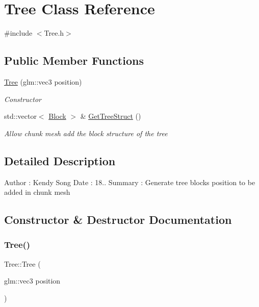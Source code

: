 \hypertarget{class_tree}{}\section{Tree Class Reference}
\label{class_tree}


{\ttfamily \#include $<$Tree.\+h$>$}

\subsection*{Public Member Functions}
\begin{DoxyCompactItemize}
\item 
\mbox{\hyperlink{class_tree_a6644970a24c82cd0ef0c0f9441b2f6e3}{Tree}} (glm\+::vec3 position)
\begin{DoxyCompactList}\small\item\em Constructor \end{DoxyCompactList}\item 
std\+::vector$<$ \mbox{\hyperlink{class_block}{Block}} $>$ \& \mbox{\hyperlink{class_tree_a09925b63b3d7fe8ba227fd454aa0906c}{Get\+Tree\+Struct}} ()
\begin{DoxyCompactList}\small\item\em Allow chunk mesh add the block structure of the tree \end{DoxyCompactList}\end{DoxyCompactItemize}


\subsection{Detailed Description}
Author \+: Kendy Song Date \+: 18.. Summary \+: Generate tree block\textquotesingle{}s position to be added in chunk mesh 

\subsection{Constructor \& Destructor Documentation}
\mbox{\label{class_tree_a6644970a24c82cd0ef0c0f9441b2f6e3}} 
\subsubsection{\texorpdfstring{Tree()}{Tree()}}
{\footnotesize\ttfamily Tree\+::\+Tree (\begin{DoxyParamCaption}\item[{glm\+::vec3}]{position }\end{DoxyParamCaption})}



